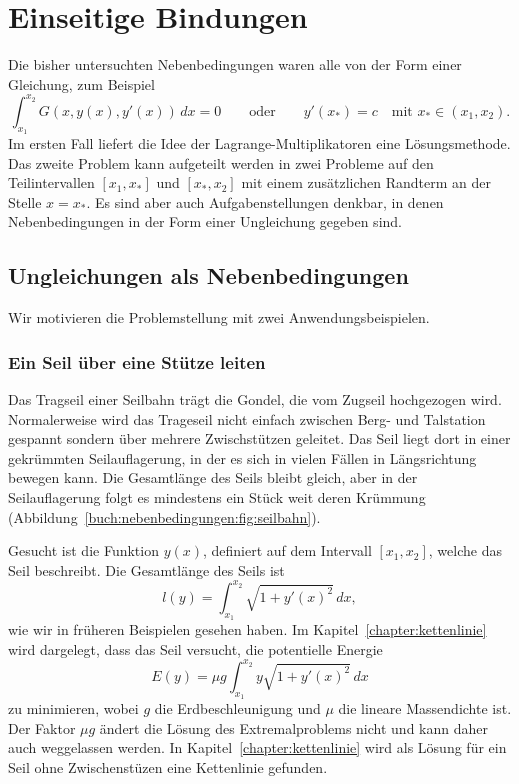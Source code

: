 %
%
%
\section{Einseitige Bindungen
\label{buch:nebenbedingungen:section:einseitigebindungen}}
Die bisher untersuchten Nebenbedingungen waren alle von der
Form einer Gleichung, zum Beispiel 
\[
\int_{x_1}^{x_2} G(x,y(x),y'(x))\,dx = 0
\qquad\text{oder}\qquad
y'(x_*) = c \quad\text{mit $x_*\in (x_1,x_2)$.}
\]
Im ersten Fall liefert die Idee der Lagrange-Multiplikatoren
eine Lösungsmethode.
Das zweite Problem kann aufgeteilt werden in zwei Probleme auf
den Teilintervallen $[x_1,x_*]$ und $[x_*,x_2]$ mit einem zusätzlichen
Randterm an der Stelle $x=x_*$.
Es sind aber auch Aufgabenstellungen denkbar, in denen Nebenbedingungen
in der Form einer Ungleichung gegeben sind.

%
%
\subsection{Ungleichungen als Nebenbedingungen
\label{buch:nebenbedingungen:einseitig:subsection:ungleichungen}}
Wir motivieren die Problemstellung mit zwei Anwendungsbeispielen.

%
%
\subsubsection{Ein Seil über eine Stütze leiten}

%
%
Das Tragseil einer Seilbahn trägt die Gondel, die vom Zugseil
hochgezogen wird.
%
Normalerweise wird das Trageseil nicht einfach zwischen Berg- und Talstation
gespannt sondern über mehrere Zwischstützen geleitet.
Das Seil liegt dort in einer gekrümmten Seilauflagerung, in der es sich
in vielen Fällen in Längsrichtung bewegen kann.
Die Gesamtlänge des Seils bleibt gleich, aber in der Seilauflagerung
%
folgt es mindestens ein Stück weit deren Krümmung
(Abbildung~\ref{buch:nebenbedingungen:fig:seilbahn}).

Gesucht ist die Funktion $y(x)$, definiert auf dem Intervall $[x_1,x_2]$,
welche das Seil beschreibt.
Die Gesamtlänge des Seils ist 
\[
l(y) = \int_{x_1}^{x_2} \sqrt{1+y'(x)^2}\,dx,
\]
wie wir in früheren Beispielen gesehen haben.
Im Kapitel~\ref{chapter:kettenlinie} wird dargelegt, dass das Seil
versucht, die potentielle Energie
\begin{equation}
E(y) = \mu g \int_{x_1}^{x_2} y\sqrt{1+y'(x)^2}\,dx
\label{buch:nebenbedingungen:einseitig:eqn:seilE}
\end{equation}
zu minimieren, wobei $g$ die Erdbeschleunigung und $\mu$ die
lineare Massendichte ist.
Der Faktor $\mu g$ ändert die Lösung des Extremalproblems nicht und 
kann daher auch weggelassen werden.
In Kapitel~\ref{chapter:kettenlinie} wird als Lösung für ein Seil
ohne Zwischenstüzen eine Kettenlinie gefunden.

